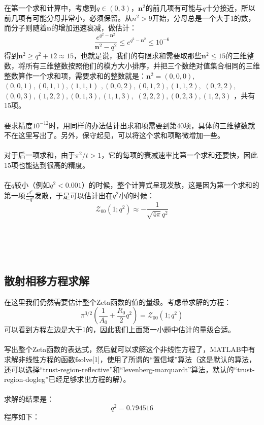 \documentclass[paper=a4, fontsize=11pt]{scrartcl} %
\numberwithin{equation}{section} %
\numberwithin{figure}{section} %
\numberwithin{table}{section} %
\begin{document}
\begin{CJK*}{UTF8}{gbsn}
在第一个求和计算中，考虑到$q\in (0,3)$，$\mathbf{n}^2$的前几项有可能与$q$十分接近，所以前几项有可能分母非常小，必须保留。从$n^2>9$开始，分母总是一个大于1的数，而分子则随着$\mathbf{n}$的增加迅速衰减，做估计：
\begin{equation}
\frac{e^{q^2-\mathbf{n}^2}}{\mathbf{n}^2-q^2} \leq e^{q^2-\mathbf{n}^2} \leq 10^{-6}
\end{equation}
得到$\mathbf{n}^2\geq q^2+12 \approx 15$，也就是说，我们的有限求和需要取那些$\mathbf{n}^2 \leq 15$的三维整数，将所有三维整数按照他们的模方大小排序，并把三个数绝对值集合相同的三维整数算作一个求和项，需要求和的整数就是：$
\mathbf{n}^2 = (0,0,0),$ $ (0,0,1),(0,1,1),(1,1,1)$ $,(0,0,2),(0,1,2),
(1,1,2),$ $(0,2,2),$ $(0,0,3),(1,2,2),(0,1,3),(1,1,3),$ $(2,2,2),(0,2,3),(1,2,3)
$
，共有15项。
\\\\
要求精度$10^{-12}$时，用同样的办法估计出求和项需要到第40项，具体的三维整数就不在这里写出了。另外，保守起见，可以将这个求和项略微增加一些。
\\\\
对于后一项求和，由于$\pi^2/t > 1$，它的每项的衰减速率比第一个求和还要快，因此15项也能达到很高的精度。
\\\\
在$q$较小（例如$q^2<0.001$）的时候，整个计算式呈现发散，这是因为第一个求和的第一项$\frac{e^{q^2}}{-q^2}$发散，于是可以估计出在$q^2$小的时候：
\begin{equation}
\mathcal{Z}_{00}(1;q^2) \approx -\frac{1}{\sqrt{4\pi}q^2}
\end{equation}
\\\\\\\\
\subsection{散射相移方程求解}
在这里我们仍然需要估计整个Zeta函数的值的量级。考虑带求解的方程：
\begin{equation}
\pi^{3/2}(\frac{1}{A_0}+\frac{R_0}{2}q^2) = \mathcal{Z}_{00}(1;q^2)
\end{equation}
可以看到方程左边是大于1的，因此我们上面第一小题中估计的量级合适。
\\\\
写出整个Zeta函数的表达式，然后就可以求解这个非线性方程了，MATLAB中有求解非线性方程的函数fsolve[1]，使用了所谓的“置信域”算法（这是默认的算法，还可以选择“trust-region-reflective”和“levenberg-marquardt”算法，默认的“trust-region-dogleg”已经足够求出方程的解）。
\\\\
求解的结果是：
\begin{equation}
q^2 = 0.794516
\end{equation}
程序如下：


\end{CJK*}
\end{document}
